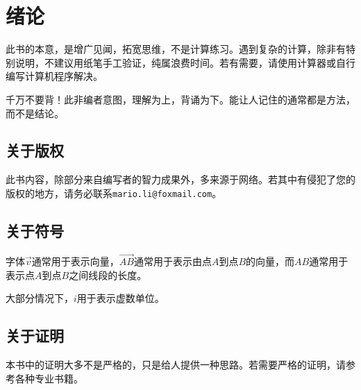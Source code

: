 
\chapter{绪论}
\label{chap:introduction}

此书的本意，是增广见闻，拓宽思维，不是计算练习。遇到复杂的计算，除非有特别说明，不建议用纸笔手工验证，纯属浪费时间。若有需要，请使用计算器或自行编写计算机程序解决。

千万不要背！此非编者意图，理解为上，背诵为下。能让人记住的通常都是方法，而不是结论。

\section{关于版权}
\label{sec:copyright}

此书内容，除部分来自编写者的智力成果外，多来源于网络。若其中有侵犯了您的版权的地方，请务必联系\verb|mario.li@foxmail.com|。

\section{关于符号}
\label{sec:symbol}

字体$\vec{v}$通常用于表示向量，$\vec{AB}$通常用于表示由点$A$到点$B$的向量，而$AB$通常用于表示点$A$到点$B$之间线段的长度。

大部分情况下，$i$用于表示虚数单位。

\section{关于证明}
\label{sec:about-proof}

本书中的证明大多不是严格的，只是给人提供一种思路。若需要严格的证明，请参考各种专业书籍。